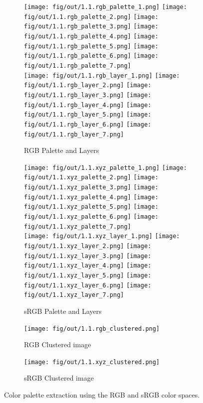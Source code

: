 \documentclass[tikz,14pt,fleqn]{article}
\begin{document}
\begin{figure}[h!]
    \centering
    \begin{subfigure}[]{\linewidth}
        \centering
        \texttt{[image: fig/out/1.1.rgb\_palette\_1.png]}
        \texttt{[image: fig/out/1.1.rgb\_palette\_2.png]}
        \texttt{[image: fig/out/1.1.rgb\_palette\_3.png]}
        \texttt{[image: fig/out/1.1.rgb\_palette\_4.png]}
        \texttt{[image: fig/out/1.1.rgb\_palette\_5.png]}
        \texttt{[image: fig/out/1.1.rgb\_palette\_6.png]}
        \texttt{[image: fig/out/1.1.rgb\_palette\_7.png]}\\
        \texttt{[image: fig/out/1.1.rgb\_layer\_1.png]}
        \texttt{[image: fig/out/1.1.rgb\_layer\_2.png]}
        \texttt{[image: fig/out/1.1.rgb\_layer\_3.png]}
        \texttt{[image: fig/out/1.1.rgb\_layer\_4.png]}
        \texttt{[image: fig/out/1.1.rgb\_layer\_5.png]}
        \texttt{[image: fig/out/1.1.rgb\_layer\_6.png]}
        \texttt{[image: fig/out/1.1.rgb\_layer\_7.png]}
        \caption{RGB Palette and Layers}
        \label{fig:1.1.rgb_palette_layers}
    \end{subfigure}
    \begin{subfigure}[]{\linewidth}
        \centering
        \texttt{[image: fig/out/1.1.xyz\_palette\_1.png]}
        \texttt{[image: fig/out/1.1.xyz\_palette\_2.png]}
        \texttt{[image: fig/out/1.1.xyz\_palette\_3.png]}
        \texttt{[image: fig/out/1.1.xyz\_palette\_4.png]}
        \texttt{[image: fig/out/1.1.xyz\_palette\_5.png]}
        \texttt{[image: fig/out/1.1.xyz\_palette\_6.png]}
        \texttt{[image: fig/out/1.1.xyz\_palette\_7.png]}\\
        \texttt{[image: fig/out/1.1.xyz\_layer\_1.png]}
        \texttt{[image: fig/out/1.1.xyz\_layer\_2.png]}
        \texttt{[image: fig/out/1.1.xyz\_layer\_3.png]}
        \texttt{[image: fig/out/1.1.xyz\_layer\_4.png]}
        \texttt{[image: fig/out/1.1.xyz\_layer\_5.png]}
        \texttt{[image: fig/out/1.1.xyz\_layer\_6.png]}
        \texttt{[image: fig/out/1.1.xyz\_layer\_7.png]}
        \caption{sRGB Palette and Layers}
        \label{fig:1.1.srgb_palette_layers}
    \end{subfigure}
    \begin{subfigure}[]{0.25\linewidth}
        \texttt{[image: fig/out/1.1.rgb\_clustered.png]}
        \caption{RGB Clustered image}
        \label{fig:1.1.rgb_clustered}
    \end{subfigure}
    \begin{subfigure}[]{0.25\linewidth}
        \texttt{[image: fig/out/1.1.xyz\_clustered.png]}
        \caption{sRGB Clustered image}
        \label{fig:1.1.srgb_clustered}
    \end{subfigure}
    \caption{Color palette extraction using the RGB and sRGB color spaces.}
\end{figure}
\end{document}
